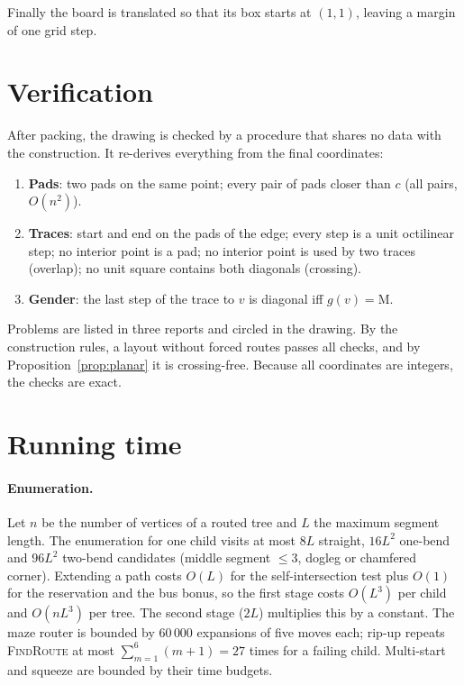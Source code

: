 \documentclass[11pt,a4paper]{article}
\theoremstyle{remark}
\begin{document}
Finally the board is translated so that its box starts at $(1,1)$, leaving a margin of one grid step.

\section{Verification}\label{sec:verify}

After packing, the drawing is checked by a procedure that shares no data with the construction. It re-derives
everything from the final coordinates:
\begin{enumerate}[nosep]
  \item \textbf{Pads}: two pads on the same point; every pair of pads closer than $c$ (all pairs, $O(n^2)$).
  \item \textbf{Traces}: start and end on the pads of the edge; every step is a unit octilinear step; no interior
        point is a pad; no interior point is used by two traces (overlap); no unit square contains both diagonals
        (crossing).
  \item \textbf{Gender}: the last step of the trace to $v$ is diagonal iff $g(v)=\mathrm M$.
\end{enumerate}
Problems are listed in three reports and circled in the drawing. By the construction rules, a layout without forced
routes passes all checks, and by Proposition~\ref{prop:planar} it is crossing-free. Because all coordinates are
integers, the checks are exact.

\section{Running time}\label{sec:complexity}

\paragraph{Enumeration.} Let $n$ be the number of vertices of a routed tree and $L$ the maximum segment length. The
enumeration for one child visits at most $8L$ straight, $16L^2$ one-bend and $96L^2$ two-bend candidates (middle
segment $\le3$, dogleg or chamfered corner). Extending a path costs $O(L)$ for the self-intersection test plus
$O(1)$ for the reservation and the bus bonus, so the first stage costs $O(L^3)$ per child and $O(nL^3)$ per tree. The
second stage ($2L$) multiplies this by a constant. The maze router is bounded by $60\,000$ expansions of five moves
each; rip-up repeats \textsc{FindRoute} at most $\sum_{m=1}^{6}(m+1)=27$ times for a failing child. Multi-start and
squeeze are bounded by their time budgets.
\end{document}
